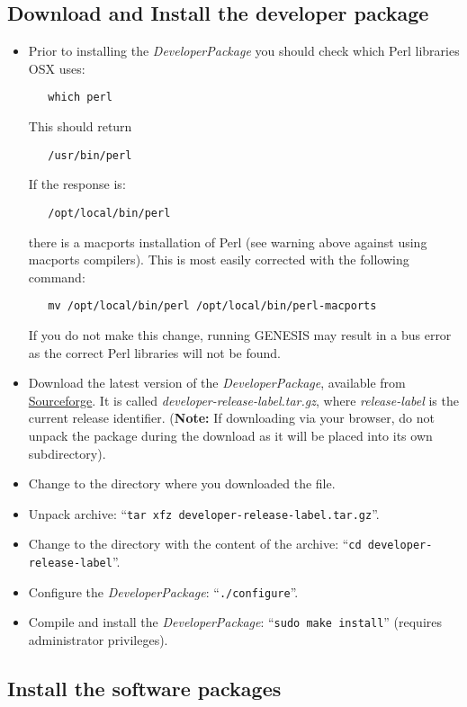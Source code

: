 \documentclass[12pt]{article}
\begin{document}
\subsection*{Download and Install the developer package}
\begin{itemize}
   \item[] Prior to installing the {\it DeveloperPackage} you should check which Perl libraries OSX uses:
   \begin{verbatim}
   which perl
   \end{verbatim}
   This should return
   \begin{verbatim}
   /usr/bin/perl
   \end{verbatim}
   If the response is:
   \begin{verbatim}
   /opt/local/bin/perl
   \end{verbatim}
  there is a macports installation of Perl (see warning above against using macports compilers). This is most easily corrected with the following command:
   \begin{verbatim}
   mv /opt/local/bin/perl /opt/local/bin/perl-macports
   \end{verbatim}
   If you do not make this change, running GENESIS may result in a bus error as the correct Perl libraries will not be found.   
   \item[] Download the latest version of the {\it DeveloperPackage}, available from \href{http://sourceforge.net/projects/neurospaces/files/}{Sourceforge}.  It is called {\it developer-release-label.tar.gz}, where {\it release-label} is the current release identifier. ({\bf Note:} If downloading via your browser, do not unpack the package during the download as it will be placed into its own subdirectory).
   \item[] Change to the directory where you downloaded the file.
   \item[] Unpack archive: ``{\tt tar xfz developer-release-label.tar.gz}''.
   \item[] Change to the directory with the content of the archive: ``{\tt cd developer-release-label}''.
   \item[] Configure the {\it DeveloperPackage}: ``{\tt ./configure}''.
   \item[] Compile and install the {\it DeveloperPackage}: ``{\tt sudo make install}'' (requires administrator privileges).
\end{itemize}

\subsection*{Install the software packages}
\end{document}
